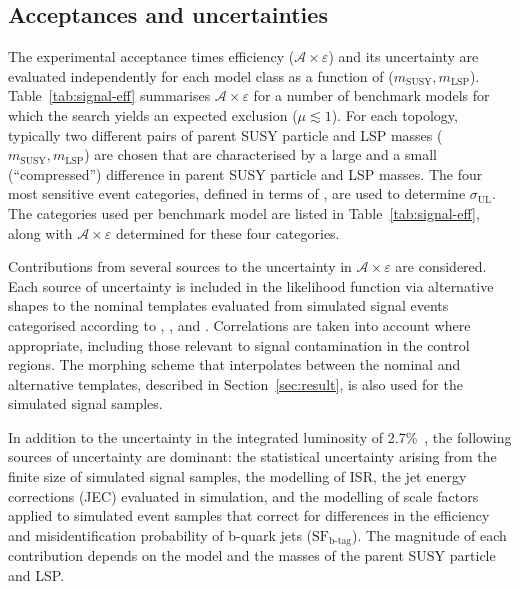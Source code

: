 \subsection{Acceptances and uncertainties}

The experimental acceptance times efficiency
($\mathcal{A}\times\varepsilon$) and its uncertainty are evaluated
independently for each model class as a function of ($m_\text{SUSY},
m_\text{LSP}$). Table~\ref{tab:signal-eff} summarises
$\mathcal{A}\times\varepsilon$ for a number of benchmark models for
which the search yields an expected exclusion ($\mu \lesssim 1$). For
each topology, typically two different pairs of parent SUSY particle and
LSP masses ($m_\text{SUSY}, m_\text{LSP}$) are chosen that are
characterised by a large and a small (\ie ``compressed'') difference
in parent SUSY particle and LSP masses. The four most sensitive event
categories, defined in terms of \njet, are used to determine
$\sigma_\text{UL}$. The categories used per benchmark model are listed
in Table~\ref{tab:signal-eff}, along with
$\mathcal{A}\times\varepsilon$ determined for these four categories.

Contributions from several sources to the uncertainty in
$\mathcal{A}\times\varepsilon$ are considered. Each source of
uncertainty is included in the likelihood function via alternative
shapes to the nominal \HTmiss templates evaluated from simulated
signal events categorised according to \njet, \nb, and
\scalht. Correlations are taken into account where appropriate,
including those relevant to signal contamination in the control
regions. The morphing scheme that interpolates between the nominal and
alternative \HTmiss templates, described in Section~\ref{sec:result},
is also used for the simulated signal samples.

In addition to the uncertainty in the integrated luminosity of
2.7\%~\cite{CMS:2016eto}, the following sources of uncertainty are
dominant: the statistical uncertainty arising from the finite size of
simulated signal samples, the modelling of ISR, the jet energy
corrections (JEC) evaluated in simulation, and the modelling of scale
factors applied to simulated event samples that correct for
differences in the efficiency and misidentification probability of
b-quark jets ($\text{SF}_\text{b-tag}$). The magnitude of each
contribution depends on the model and the masses of the parent
SUSY particle and LSP.

